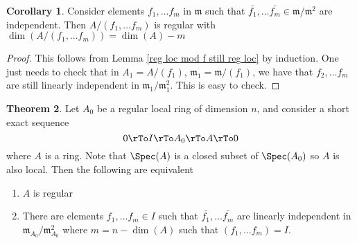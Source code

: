 \documentclass[12 pt]{article}
\theoremstyle{definition}
\newtheorem{theorem}{Theorem}[section]
\newtheorem{corollary}[theorem]{Corollary}
\begin{document}
\begin{corollary}  Consider elements $f_1, \ldots f_m$ in $\mathfrak{m}$ such that $\bar{f_1}, \ldots \bar{f_m} \in \mathfrak{m}/\mathfrak{m}^2$ are independent. Then $A/(f_1, \ldots f_m)$ is regular with $\dim(A/(f_1, \ldots f_m))=\dim(A)-m$
\label{reg local mod fs still reg loc}
\end{corollary}
\begin{proof} This follows from Lemma \ref{reg loc mod f still reg loc} by induction. One just needs to check that in $A_1=A/(f_1)$, $\mathfrak{m}_1=\mathfrak{m}/(f_1)$, we have that $f_2, \ldots f_m$ are still linearly independent in $\mathfrak{m}_1/\mathfrak{m}_1^2$. This is easy to check.
\end{proof}



\begin{theorem} Let $A_0$ be a regular local ring of dimension $n$, and consider a short exact sequence
\[0 \rTo I \rTo A_0 \rTo A \rTo 0\]
where $A$ is a ring. Note that $\Spec(A)$ is a closed subset of $\Spec(A_0)$ so $A$ is also local. Then the following are equivalent
\begin{enumerate}
\item $A$ is regular
\item There are elements $f_1, \ldots f_m \in I$ such that $\bar{f_1}, \ldots \bar{f_m}$ are linearly independent in $\mathfrak{m}_{A_0}/\mathfrak{m}_{A_0}^2$ where $m=n-\dim(A)$ such that $(f_1, \ldots f_m)=I$.
\end{enumerate}
\label{reg loc main thm}
\end{theorem}
\end{document}
